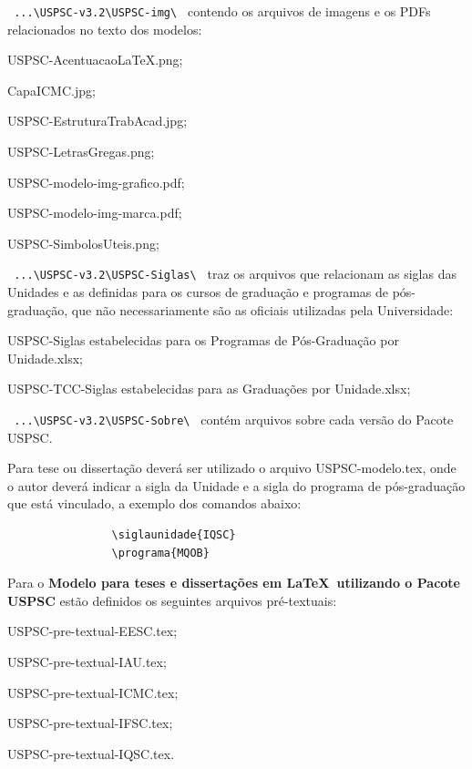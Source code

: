 \begin{alineas}
	\item \verb+ ...\USPSC-v3.2\USPSC-img\ + contendo os arquivos de imagens e os PDFs relacionados no texto dos modelos: 
		\begin{alineas}	
			\item USPSC-AcentuacaoLaTeX.png;
			\item CapaICMC.jpg;
			\item USPSC-EstruturaTrabAcad.jpg;
			\item USPSC-LetrasGregas.png;
			\item USPSC-modelo-img-grafico.pdf;
			\item USPSC-modelo-img-marca.pdf;
			\item USPSC-SimbolosUteis.png;
		\end{alineas}	
	
	\item \verb+ ...\USPSC-v3.2\USPSC-Siglas\ + traz os arquivos que relacionam as siglas das Unidades e as definidas para os cursos de graduação e programas de pós-graduação, que não necessariamente são as oficiais utilizadas pela Universidade: 
		\begin{alineas}	
			\item USPSC-Siglas estabelecidas para os Programas de Pós-Graduação por Unidade.xlsx;
			\item USPSC-TCC-Siglas estabelecidas para as Graduações por Unidade.xlsx;
		\end{alineas}
		
	\item \verb+ ...\USPSC-v3.2\USPSC-Sobre\ + contém arquivos sobre cada versão do Pacote USPSC.

\end{alineas}	 

		
Para tese ou dissertação deverá ser utilizado o arquivo USPSC-modelo.tex, onde o autor deverá indicar a sigla da Unidade e a sigla do programa de pós-graduação que está vinculado, a exemplo dos comandos abaixo:
		
			\begin{verbatim}
				\siglaunidade{IQSC}
				\programa{MQOB}
			\end{verbatim}
			
Para o \textbf{Modelo para teses e dissertações em \LaTeX\ utilizando o Pacote USPSC} estão definidos os seguintes arquivos pré-textuais:
			
			\begin{alineas}	 
				\item USPSC-pre-textual-EESC.tex;
				\item USPSC-pre-textual-IAU.tex;
				\item USPSC-pre-textual-ICMC.tex;
				\item USPSC-pre-textual-IFSC.tex;
				\item USPSC-pre-textual-IQSC.tex.
			\end{alineas}
			
